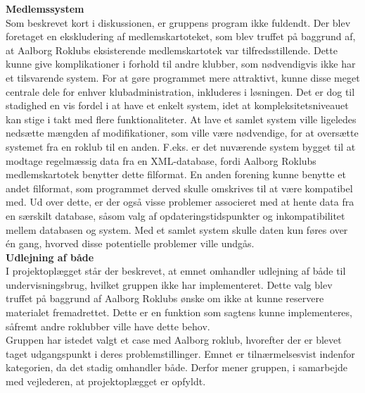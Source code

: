 \textbf{Medlemssystem}\\
Som beskrevet kort i diskussionen, er gruppens program ikke fuldendt. Der blev foretaget en ekskludering af medlemskartoteket, som blev truffet på baggrund af, at Aalborg Roklubs eksisterende medlemskartotek var tilfredsstillende. Dette kunne give komplikationer i forhold til andre klubber, som nødvendigvis ikke har et tilsvarende system. For at gøre programmet mere attraktivt, kunne disse meget centrale dele for enhver klubadministration, inkluderes i løsningen. Det er dog til stadighed en vis fordel i at have et enkelt system, idet at kompleksitetsniveauet kan stige i takt med flere funktionaliteter. At lave et samlet system ville ligeledes nedsætte mængden af modifikationer, som ville være nødvendige, for at oversætte systemet fra en roklub til en anden. F.eks. er det nuværende system bygget til at modtage regelmæssig data fra en XML-database, fordi Aalborg Roklubs medlemskartotek benytter dette filformat. En anden forening kunne benytte et andet filformat, som programmet derved skulle omskrives til at være kompatibel med. Ud over dette, er der også visse problemer associeret med at hente data fra en særskilt database, såsom valg af opdateringstidspunkter og inkompatibilitet mellem databasen og system. Med et samlet system skulle daten kun føres over én gang, hvorved disse potentielle problemer ville undgås. \\

\textbf{Udlejning af både}\\
I projektoplægget står der beskrevet, at emnet omhandler udlejning af både til undervisningsbrug, hvilket gruppen ikke har implementeret. Dette valg blev truffet på baggrund af Aalborg Roklubs ønske om ikke at kunne reservere materialet fremadrettet. Dette er en funktion som sagtens kunne implementeres, såfremt andre roklubber ville have dette behov. \\

Gruppen har istedet valgt et case med Aalborg roklub, hvorefter der er blevet taget udgangspunkt i deres problemstillinger. Emnet er tilnærmelsesvist indenfor kategorien, da det stadig omhandler både. Derfor mener gruppen, i samarbejde med vejlederen, at projektoplægget er opfyldt.
